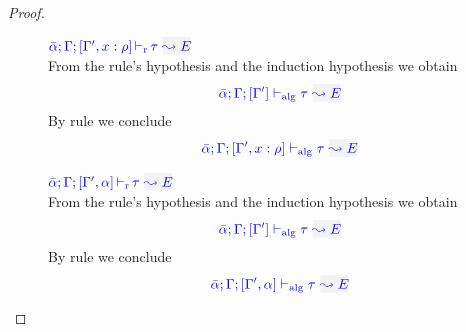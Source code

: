 \begin{proof}
\begin{description}
\item[]\quad
$\dlres{\bar\alpha}{\tenv}{\tenv',\relation{x}{\rulet}}{\type}{E}$ \ \\

From the rule's hypothesis and the induction hypothesis we obtain
\begin{equation*}
  \adlres{\bar\alpha}{\tenv}{\tenv'}{\type}{E}
\end{equation*}
By rule  we conclude
\begin{equation*}
  \adlres{\bar\alpha}{\tenv}{\tenv',\relation{x}{\rulet}}{\type}{E}
\end{equation*}

\item[]\quad
$\dlres{\bar\alpha}{\tenv}{\tenv',\alpha}{\type}{E}$\ \\

From the rule's hypothesis and the induction hypothesis we obtain
\begin{equation*}
\adlres{\bar\alpha}{\tenv}{\tenv'}{\type}{E}
\end{equation*}
By rule  we conclude
\begin{equation*}
  \adlres{\bar\alpha}{\tenv}{\tenv',\alpha}{\type}{E}
\end{equation*}
\end{description}
\end{proof}

